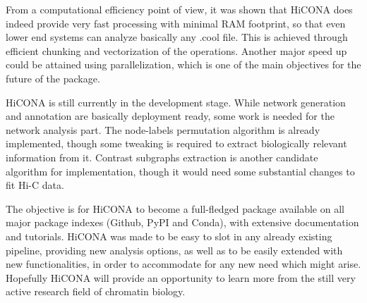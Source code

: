 From a computational efficiency point of view, it was shown that HiCONA does indeed provide very fast processing with minimal RAM footprint, so that even lower end systems can analyze basically any .cool file. This is achieved through efficient chunking and vectorization of the operations. Another major speed up could be attained using parallelization, which is one of the main objectives for the future of the package. 

HiCONA is still currently in the development stage. While network generation and annotation are basically deployment ready, some work is needed for the network analysis part. The node-labels permutation algorithm is already implemented, though some tweaking is required to extract biologically relevant information from it. Contrast subgraphs extraction is another candidate algorithm for implementation, though it would need some substantial changes to fit Hi-C data. 

The objective is for HiCONA to become a full-fledged package available on all major package indexes (Github, PyPI and Conda), with extensive documentation and tutorials. HiCONA was made to be easy to slot in any already existing pipeline, providing new analysis options, as well as to be easily extended with new functionalities, in order to accommodate for any new need which might arise. Hopefully HiCONA will provide an opportunity to learn more from the still very active research field of chromatin biology.
